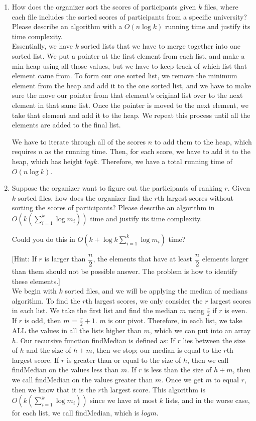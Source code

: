 \documentclass{article}
\begin{document}
\begin{enumerate}
\item How does the organizer sort the scores of participants given $k$
  files, where each file includes the sorted scores of participants
  from a specific university?  Please describe an algorithm with a
  $O(n\log k)$ running time and justify its time complexity.\\

Essentially, we have $k$ sorted lists that we have to merge together into one sorted list. We put a pointer at  the first element from each list, and make a min heap using all those values, but we have to keep track of which list that element came from. To form our one sorted list, we remove the minimum element from the heap and add it to the one sorted list, and we have to make sure the move our pointer from that element's original list over to the next element in that same list. Once the pointer is moved to the next element, we take that element and add it to the heap. We repeat this process until all the elements are added to the final list. 

We have to iterate through all of the scores $n$ to add them to the heap, which requires $n$ as the running time. Then, for each score, we have to add it to the heap, which has height $log k$. Therefore, we have a total running time of $O(n\log k)$.

\item Suppose the organizer want to figure out the participants of
  ranking $r$. Given $k$ sorted files, how does the organizer find the
  $r$th largest scores without sorting the scores of participants? Please 
  describe an algorithm in $O(k(\sum_{i=1}^{k}\log m_{i}))$ time and justify
  its time complexity. 

Could you do this in $O(k+\log k \sum_{i=1}^{k}\log m_{i})$ time? 

  [Hint: If $r$ is larger than $\dfrac{n}{2}$, the elements that have at least $\dfrac{n}{2}$ 
  elements larger than them should not be possible answer. The problem is how to identify these
  elements.]\\

We begin with $k$ sorted files, and we will be applying the median of medians algorithm. To find the $r$th largest scores, we only consider the $r$ largest scores in each list. We take the first list and find the median $m$ using $\frac{r}{2}$ if $r$ is even. If $r$ is odd, then $m$ = $\frac{r}{2} + 1$. $m$ is our pivot. Therefore, in each list, we take ALL the values in all the lists higher than $m$, which we can put into an array $h$. Our recursive function findMedian is defined as: If $r$ lies between the size of $h$ and the size of $h + m$, then we stop; our median is equal to the $r$th largest score. If $r$ is greater than or equal to the size of $h$, then we call findMedian on the values less than $m$. If $r$ is less than the size of $h + m$, then we call findMedian on the values greater than $m$. Once we get $m$ to equal $r$, then we know that it is the $r$th largest score. This algorithm is $O(k(\sum_{i=1}^{k}\log m_{i}))$ since we have at most $k$ lists, and in the worse case, for each list, we call findMedian, which is $log m$. \\


\end{enumerate}
\end{document}
